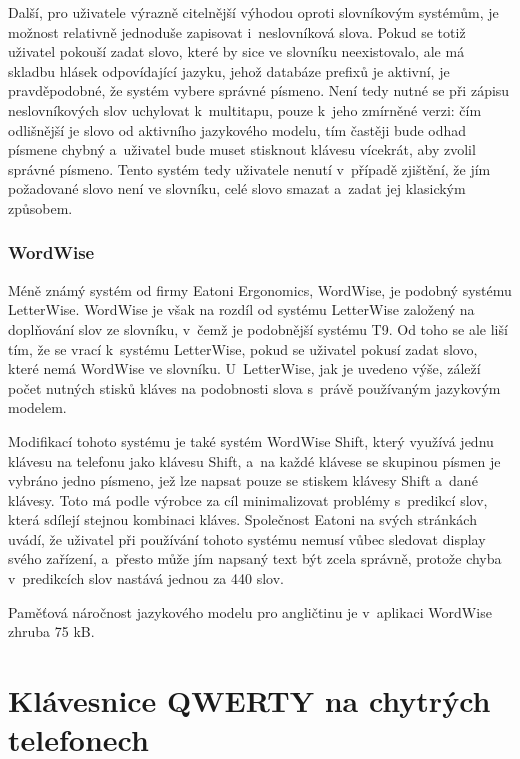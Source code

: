 \documentclass[a4paper,11pt,openany]{book} %
\begin{document}
Další, pro uživatele výrazně citelnější výhodou oproti slovníkovým systémům, je možnost relativně jednoduše zapisovat i~neslovníková slova. Pokud se totiž uživatel pokouší zadat slovo, které by sice ve slovníku neexistovalo, ale má skladbu hlásek odpovídající jazyku, jehož databáze prefixů je aktivní, je pravděpodobné, že systém vybere správné písmeno. Není tedy nutné se při zápisu neslovníkových slov uchylovat k~multitapu, pouze k~jeho zmírněné verzi: čím odlišnější je slovo od aktivního jazykového modelu, tím častěji bude odhad písmene chybný a~uživatel bude muset stisknout klávesu vícekrát, aby zvolil správné písmeno. Tento systém tedy uživatele nenutí v~případě zjištění, že jím požadované slovo není ve slovníku, celé slovo smazat a~zadat jej klasickým způsobem. \parencites[5234]{ghayoomi2009overview}[112]{MacKenzie2001}

\subsubsection{WordWise}

Méně známý systém od firmy Eatoni Ergonomics, WordWise, je podobný systému LetterWise. WordWise je však na rozdíl od systému LetterWise založený na doplňování slov ze slovníku, v~čemž je podobnější systému T9. Od toho se ale liší tím, že se vrací k~systému LetterWise, pokud se uživatel pokusí zadat slovo, které nemá WordWise ve slovníku. U~LetterWise, jak je uvedeno výše, záleží počet nutných stisků kláves na podobnosti slova s~právě používaným jazykovým modelem. \parencite{eatoniwordwise}

Modifikací tohoto systému je také systém WordWise Shift, který využívá jednu klávesu na telefonu jako klávesu Shift, a~na každé klávese se skupinou písmen je vybráno jedno písmeno, jež lze napsat pouze se stiskem klávesy Shift a~dané klávesy. Toto má podle výrobce za cíl minimalizovat problémy s~predikcí slov, která sdílejí stejnou kombinaci kláves. Společnost Eatoni na svých stránkách uvádí, že uživatel při používání tohoto systému nemusí vůbec sledovat display svého zařízení, a~přesto  může jím napsaný text být zcela správně, protože chyba v~predikcích slov nastává jednou za 440 slov. \parencite{eatoniwordwise}

Paměťová náročnost jazykového modelu pro angličtinu je v~aplikaci WordWise zhruba 75 kB. \parencite{eatoniwordwise} %

\section{Klávesnice QWERTY na chytrých telefonech}
\end{document}
